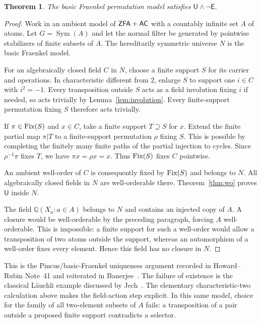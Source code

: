 \documentclass[11pt,a4paper]{article}
\newtheorem{theorem}{Theorem}[section]
\theoremstyle{definition}\newtheorem{definition}[theorem]{Definition}
\theoremstyle{remark}\newtheorem{remark}[theorem]{Remark}
\newcommand{\AC}{\mathsf{AC}}\newcommand{\BPI}{\mathsf{BPI}}
\newcommand{\E}{\mathsf E}\newcommand{\U}{\mathsf U}
\newcommand{\Q}{\mathbb Q}\newcommand{\F}{\mathbb F}
\begin{document}
\begin{theorem}\label{thm:fraenkel}
The basic Fraenkel permutation model satisfies $\U\wedge\neg\E$.
\end{theorem}
\begin{proof}
Work in an ambient model of $\ZFA+\AC$ with a countably infinite set $A$ of atoms. Let $G=\operatorname{Sym}(A)$ and let the normal filter be generated by pointwise stabilizers of finite subsets of $A$. The hereditarily symmetric universe $N$ is the basic Fraenkel model.

For an algebraically closed field $C$ in $N$, choose a finite support $S$ for its carrier and operations. In characteristic different from $2$, enlarge $S$ to support one $i\in C$ with $i^2=-1$. Every transposition outside $S$ acts as a field involution fixing $i$ if needed, so acts trivially by Lemma~\ref{lem:involution}. Every finite-support permutation fixing $S$ therefore acts trivially.

If $\pi\in\operatorname{Fix}(S)$ and $x\in C$, take a finite support $T\supseteq S$ for $x$. Extend the finite partial map $\pi|T$ to a finite-support permutation $\rho$ fixing $S$. This is possible by completing the finitely many finite paths of the partial injection to cycles. Since $\rho^{-1}\pi$ fixes $T$, we have $\pi x=\rho x=x$. Thus $\operatorname{Fix}(S)$ fixes $C$ pointwise.

An ambient well-order of $C$ is consequently fixed by $\operatorname{Fix}(S)$ and belongs to $N$. All algebraically closed fields in $N$ are well-orderable there. Theorem~\ref{thm:wo} proves $\U$ inside $N$.

The field $\Q(X_a:a\in A)$ belongs to $N$ and contains an injected copy of $A$. A closure would be well-orderable by the preceding paragraph, forcing $A$ well-orderable. This is impossible: a finite support for such a well-order would allow a transposition of two atoms outside the support, whereas an automorphism of a well-order fixes every element. Hence this field has no closure in $N$.
\end{proof}

This is the Pincus/basic-Fraenkel uniqueness argument recorded in Howard--Rubin Note~41 and reiterated in Banerjee~\cite{Banerjee}. The failure of existence is the classical L\"auchli example discussed by Jech~\cite[Theorem~10.13]{Jech}. The elementary characteristic-two calculation above makes the field-action step explicit. In this same model, choice for the family of all two-element subsets of $A$ fails: a transposition of a pair outside a proposed finite support contradicts a selector.
\end{document}
